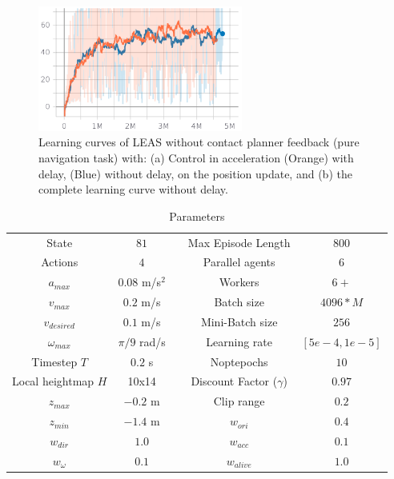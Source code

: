 \begin{figure}
    \centering
    \includegraphics[width=0.6\textwidth]{Figures/Chapter_LEAS/learning_curves_P1.png}
    \caption{Learning curves of LEAS without contact planner feedback (pure navigation task) with: (a) Control in acceleration (Orange) with delay, (Blue) without delay, on the position update, and (b) the complete learning curve without delay.}
    \label{fig:control_LEAS_learning_curves}
\end{figure}

\begin{table}[tb]
\begin{center}
\caption{Parameters}
\begin{tabular}{|c|c| c |c|c|}
 State & $81$ && Max Episode Length & $800$\\
 Actions & $4$ && Parallel agents & $6$\\
 $a_{max}$ & $0.08$ m/s$^2$ && Workers & $6+$\\
 $v_{max}$ & $0.2$ m/s && Batch size & $4096*M$\\
 $v_{desired}$ & $0.1$ m/s && Mini-Batch size & $256$\\
 $\omega_{max}$ & $\pi/9$ rad/s && Learning rate & $[5e-4,1e-5]$\\
 Timestep $T$ & $0.2$ s && Noptepochs & $10$\\
 Local heightmap $H$ & 10x14 && Discount Factor ($\gamma$) & $0.97$\\
 $z_{max}$ & $-0.2$ m  && Clip range & $0.2$\\
 $z_{min}$ & $-1.4$ m &&
 $w_{ori}$ & $0.4$ \\
 $w_{dir}$ & $1.0$  &&
 $w_{acc}$ & $0.1$ \\
 $w_{\omega}$ & $0.1$  &&
 $w_{alive}$ & $1.0$
\end{tabular}
\label{tab:param}
\end{center}
\end{table}


